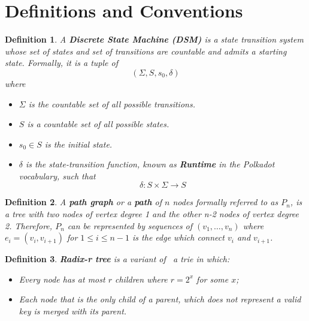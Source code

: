 \documentclass{book}
\newcommand{\tmstrong}[1]{\textbf{#1}}
\newcommand{\tmtextbf}[1]{{\bfseries{#1}}}
\newtheorem{definition}{Definition}
\providecommand{\tmstrong}[1]{\tmtextbf{#1}}
\providecommand{\tmtextbf}[1]{\tmtextbf{#1}}
\newtheorem{definition}{Definition}
\begin{document}
\section{Definitions and Conventions}\label{sect-defn-conv}

\begin{definition}
  \label{defn-state-machine}A {\tmstrong{Discrete State Machine (DSM)}} is a
  state transition system whose set of states and set of transitions are
  countable and admits a starting state. Formally, it is a tuple of
  \[  (\Sigma, S, s_0, \delta) \]
  where
  \begin{itemize}
    \item $\Sigma$ is the countable set of all possible transitions.
    
    \item $S$ is a countable set of all possible states.
    
    \item $s_0 \in S$ is the initial state.
    
    \item $\delta$ is the state-transition function, known as
    \label{defn-runtime}{\tmstrong{Runtime}} in the Polkadot vocabulary, such
    that
    \[ \delta : S \times \Sigma \rightarrow S \]
  \end{itemize}
\end{definition}

\begin{definition}
  \label{defn-path-graph}A {\tmstrong{path graph}} or a {\tmstrong{path}} of
  $n$ nodes formally referred to as \label{autolab1}{\tmstrong{$P_n$}}, is a
  tree with two nodes of vertex degree 1 and the other n-2 nodes of vertex
  degree 2. Therefore, $P_n$ can be represented by sequences of $(v_1, \ldots,
  v_n)$ where $e_i = (v_i, v_{i + 1})$ for $1 \leqslant i \leqslant n - 1$ is
  the edge which connect $v_i$ and $v_{i + 1}$.
\end{definition}

\begin{definition}
  \label{defn-radix-tree}{\tmstrong{Radix-r tree}} is a variant of \ a trie in
  which:
  \begin{itemize}
    \item Every node has at most $r$ children where $r = 2^x$ for some $x$;
    
    \item Each node that is the only child of a parent, which does not
    represent a valid key is merged with its parent.
  \end{itemize}
\end{definition}
\end{document}
